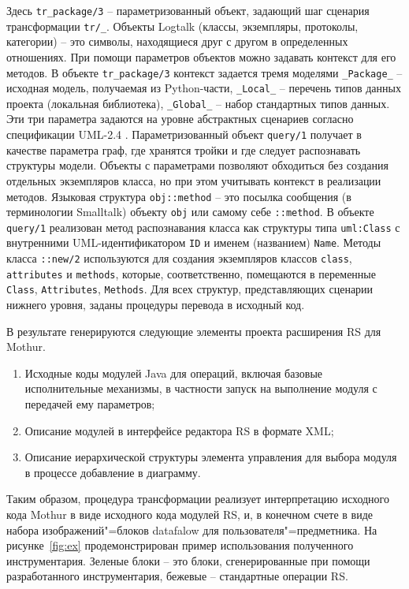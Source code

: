 \documentclass[12pt]{article}
\begin{document}
Здесь \texttt{tr\_package/3} -- параметризованный объект, задающий шаг сценария трансформации \texttt{tr/\_}.  Объекты Logtalk (классы, экземпляры, протоколы, категории) -- это символы, находящиеся друг с другом в определенных отношениях.  При помощи параметров объектов можно задавать контекст для его методов.  В объекте \texttt{tr\_package/3} контекст задается тремя моделями \texttt{\_Package\_} -- исходная модель, получаемая из Python-части, \texttt{\_Local\_} -- перечень типов данных проекта (локальная библиотека), \texttt{\_Global\_} -- набор стандартных типов данных.  Эти три параметра задаются на уровне абстрактных сценариев согласно спецификации UML-2.4 \cite{GT}.  Параметризованный объект \texttt{query/1} получает в качестве параметра граф, где хранятся тройки и где следует распознавать структуры модели.  Объекты с параметрами позволяют обходиться без создания отдельных экземпляров класса, но при этом учитывать контекст в реализации методов.  Языковая структура \texttt{obj::method} -- это посылка сообщения (в терминологии Smalltalk) объекту \texttt{obj} или самому себе \texttt{::method}.  В объекте \texttt{query/1} реализован метод распознавания класса как структуры типа \texttt{uml:Class} с внутренними UML-идентификатором \texttt{ID} и именем (названием) \texttt{Name}.  Методы класса \texttt{::new/2} используются для создания экземпляров классов \texttt{class}, \texttt{attributes} и \texttt{methods}, которые, соответственно, помещаются в переменные \texttt{Class}, \texttt{Attributes}, \texttt{Methods}.  Для всех структур, представляющих сценарии нижнего уровня, заданы процедуры перевода в исходный код.

В результате генерируются следующие элементы проекта расширения RS для Mothur.
\begin{enumerate}
\item Исходные коды модулей Java для операций, включая базовые исполнительные механизмы, в частности запуск на выполнение модуля с передачей ему параметров;
\item Описание модулей в интерфейсе редактора RS в формате XML;
\item Описание иерархической структуры элемента управления для выбора модуля в процессе добавление в диаграмму.
\end{enumerate}
Таким образом, процедура трансформации реализует интерпретацию исходного кода Mothur в виде исходного кода модулей RS, и, в конечном счете в виде набора изображений"=блоков datafalow для пользователя"=предметника.  На рисунке~\ref{fig:ex} продемонстрирован пример использования полученного инструментария.  Зеленые блоки --  это блоки, сгенерированные при помощи разработанного инструментария, бежевые -- стандартные операции RS.
\end{document}
